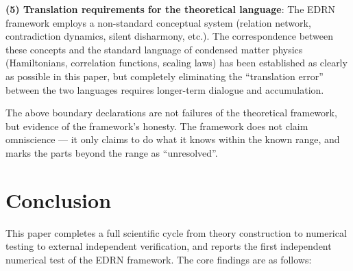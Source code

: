 \documentclass[prb,reprint,twocolumn,superscriptaddress]{revtex4-2}
\begin{document}
\textbf{(5) Translation requirements for the theoretical language}: The EDRN framework employs a non-standard conceptual system (relation network, contradiction dynamics, silent disharmony, etc.). The correspondence between these concepts and the standard language of condensed matter physics (Hamiltonians, correlation functions, scaling laws) has been established as clearly as possible in this paper, but completely eliminating the ``translation error'' between the two languages requires longer-term dialogue and accumulation.

The above boundary declarations are not failures of the theoretical framework, but evidence of the framework's honesty. The framework does not claim omniscience --- it only claims to do what it knows within the known range, and marks the parts beyond the range as ``unresolved''.

\section{Conclusion}\label{sec:conclusion}

This paper completes a full scientific cycle from theory construction to numerical testing to external independent verification, and reports the first independent numerical test of the EDRN framework. The core findings are as follows:
\end{document}
